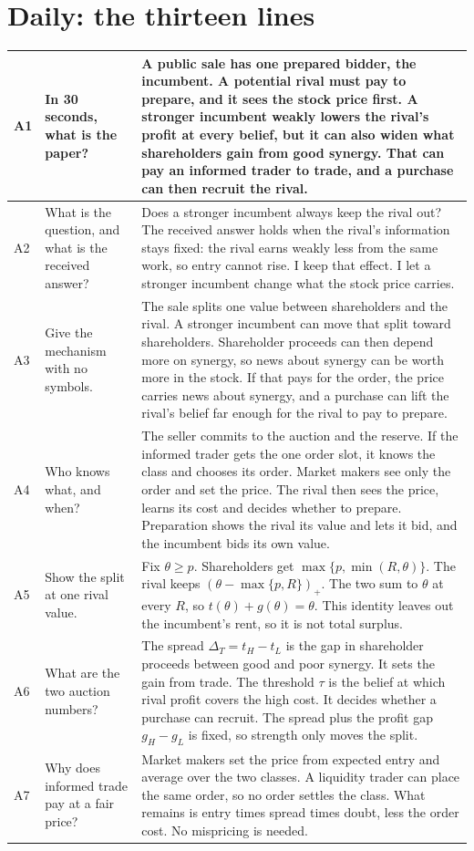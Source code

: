 \documentclass[10.5pt]{article}
\makeatletter
\newenvironment{cards}{\begin{longtable}{@{}IQA@{}}}{\end{longtable}}
\newcommand{\card}[3]{#1 & #2 & #3\\\midrule}
\newcommand{\src}[1]{\par\vspace{-2pt}{\footnotesize\color{gr}#1}}
\makeatother
\begin{document}
\section{Daily: the thirteen lines}
\begin{cards}
\card{A1}{In 30 seconds, what is the paper?}{A public sale has one prepared bidder, the incumbent. A potential rival must pay to prepare, and it sees the stock price first. A stronger incumbent weakly lowers the rival's profit at every belief, but it can also widen what shareholders gain from good synergy. That can pay an informed trader to trade, and a purchase can then recruit the rival.}
\card{A2}{What is the question, and what is the received answer?}{Does a stronger incumbent always keep the rival out? The received answer holds when the rival's information stays fixed: the rival earns weakly less from the same work, so entry cannot rise. I keep that effect. I let a stronger incumbent change what the stock price carries.}
\card{A3}{Give the mechanism with no symbols.}{The sale splits one value between shareholders and the rival. A stronger incumbent can move that split toward shareholders. Shareholder proceeds can then depend more on synergy, so news about synergy can be worth more in the stock. If that pays for the order, the price carries news about synergy, and a purchase can lift the rival's belief far enough for the rival to pay to prepare.}
\card{A4}{Who knows what, and when?}{The seller commits to the auction and the reserve. If the informed trader gets the one order slot, it knows the class and chooses its order. Market makers see only the order and set the price. The rival then sees the price, learns its cost and decides whether to prepare. Preparation shows the rival its value and lets it bid, and the incumbent bids its own value.}
\card{A5}{Show the split at one rival value.}{Fix $\theta\ge p$. Shareholders get $\max\{p,\min(R,\theta)\}$. The rival keeps $(\theta-\max\{p,R\})_+$. The two sum to $\theta$ at every $R$, so $t(\theta)+g(\theta)=\theta$. This identity leaves out the incumbent's rent, so it is not total surplus.\src{Paper §3; frame 8}}
\card{A6}{What are the two auction numbers?}{The spread $\Delta_T=t_H-t_L$ is the gap in shareholder proceeds between good and poor synergy. It sets the gain from trade. The threshold $\tau$ is the belief at which rival profit covers the high cost. It decides whether a purchase can recruit. The spread plus the profit gap $g_H-g_L$ is fixed, so strength only moves the split.\src{Paper §3; frames 10, 11}}
\card{A7}{Why does informed trade pay at a fair price?}{Market makers set the price from expected entry and average over the two classes. A liquidity trader can place the same order, so no order settles the class. What remains is entry times spread times doubt, less the order cost. No mispricing is needed.\src{Paper §3; frame 12}}

\end{cards}
\end{document}
